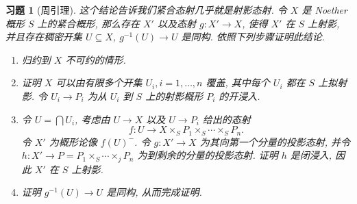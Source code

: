 \documentclass{article}
\theoremstyle{exercise}
\newtheorem{exercise}{习题}[section]
\theoremstyle{plain}
\theoremstyle{remark}
\begin{document}
\begin{exercise}[周引理]
  这个结论告诉我们紧合态射几乎就是射影态射.
  令 $X$ 是 Noether 概形 $S$ 上的紧合概形,
  那么存在 $X'$ 以及态射 $g \colon X' \to X$,
  使得 $X'$ 在 $S$ 上射影, 并且存在稠密开集 $U \subseteq X$, $g^{-1}(U) \to U$ 是同构.
  依照下列步骤证明此结论.
  \begin{enumerate}[label=(\alph*)]
    \item 归约到 $X$ 不可约的情形.
    \item 证明 $X$ 可以由有限多个开集 $U_i, i = 1, \dots, n$ 覆盖,
          其中每个 $U_i$ 都在 $S$ 上拟射影.
          令 $U_i \to P_i$ 为从 $U_i$ 到 $S$ 上的射影概形 $P_i$ 的开浸入.
    \item 令 $U = \bigcap U_i$, 考虑由 $U \to X$ 以及 $U \to P_i$ 给出的态射
          \[
            f \colon U \to X \times_S P_1 \times_S \cdots \times_S P_n.
          \]
          令 $X'$ 为概形论像 $f(U)^-$.
          令 $g \colon X' \to X$ 为其向第一个分量的投影态射,
          并令 $h \colon X' \to P = P_1 \times_S \cdots \times_j P_n$ 为到剩余的分量的投影态射.
          证明 $h$ 是闭浸入, 因此 $X'$ 在 $S$ 上射影.
    \item 证明 $g^{-1}(U) \to U$ 是同构, 从而完成证明.
  \end{enumerate}
\end{exercise}
\end{document}
